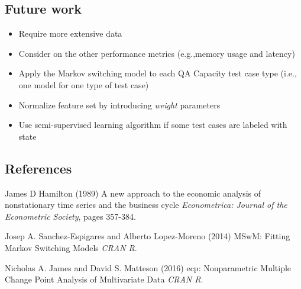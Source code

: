 \documentclass{beamer}
\begin{document}
\subsection{Future work}
\begin{frame}
\begin{itemize}
	\item Require more extensive data
	\item Consider on the other performance metrics (e.g.,memory usage and latency) 
	\item Apply the Markov switching model to each QA Capacity test case type (i.e., one model for one type of test case)
	\item Normalize feature set by introducing \textit{weight} parameters
	\item Use semi-supervised learning algorithm if some test cases are labeled with state
\end{itemize}
\end{frame}

\subsection{References}
\begin{frame}
\footnotesize{
	\begin{thebibliography}{99} %
		 James D Hamilton (1989)
		\newblock A new approach to the economic analysis of nonstationary time series and the business cycle
		\newblock \emph{Econometrica: Journal of the Econometric Society}, pages 357-384.
	\end{thebibliography}
	
	\begin{thebibliography}{99} %
		 Josep A. Sanchez-Espigares and Alberto Lopez-Moreno (2014)
		\newblock MSwM: Fitting Markov Switching Models
		\newblock \emph{CRAN R}.
	\end{thebibliography}

	\begin{thebibliography}{99} %
		 Nicholas A. James and David S. Matteson (2016)
		\newblock ecp: Nonparametric Multiple Change Point Analysis of Multivariate Data
		\newblock \emph{CRAN R}.
	\end{thebibliography}
}
\end{frame}
\end{document}
